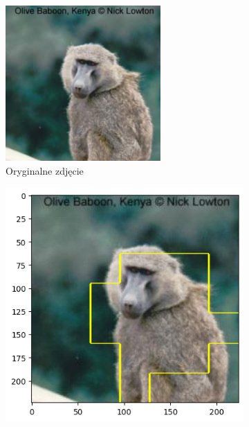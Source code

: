
\begin{figure}[h]
	\centering
	\begin{subfigure}[b]{0.3\textwidth}
		\includegraphics[width=.9\textwidth]{img/examples/appendix/n02486410_08484}
		\caption{Oryginalne zdjęcie}  \label{}
	\end{subfigure}
	\begin{subfigure}[b]{0.3\textwidth}
		\centering\includegraphics[width=.9\textwidth]{img/examples/appendix/n02486410_08484_gradcam}

\end{subfigure}
\end{figure}
